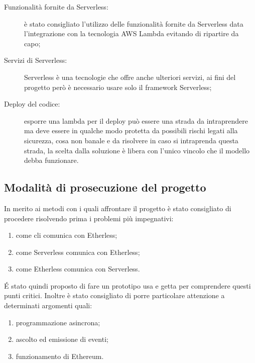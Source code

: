 \begin{description}
	\item[Funzionalità fornite da Serverless:] è stato consigliato l'utilizzo delle funzionalità fornite da Serverless data l'integrazione con la tecnologia AWS Lambda evitando di ripartire da capo;
	\item[Servizi di Serverless:] Serverless è una tecnologie che offre anche ulteriori servizi, ai fini del progetto però è necessario usare solo il framework Serverless;
	\item[Deploy del codice:] esporre una lambda per il deploy può essere una strada da intraprendere ma deve essere in qualche modo protetta da possibili rischi legati alla sicurezza, cosa non banale e da risolvere in caso si intraprenda questa strada, la scelta dalla soluzione è libera con l'unico vincolo che il modello debba funzionare.
\end{description}

\subsection{Modalità di prosecuzione del progetto}
In merito ai metodi con i quali affrontare il progetto è stato consigliato di procedere risolvendo prima i problemi più impegnativi:
	\begin{enumerate}
		\item come cli comunica con Etherless;
		\item come Serverless comunica con Etherless;
		\item come Etherless comunica con Serverless.
	\end{enumerate}
	É stato quindi proposto di fare un prototipo usa e getta per comprendere questi punti critici.
	Inoltre è stato consigliato di porre particolare attenzione a determinati argomenti quali:
	\begin{enumerate}
		\item programmazione asincrona;
		\item ascolto ed emissione di eventi;
		\item funzionamento di Ethereum.
	\end{enumerate}
